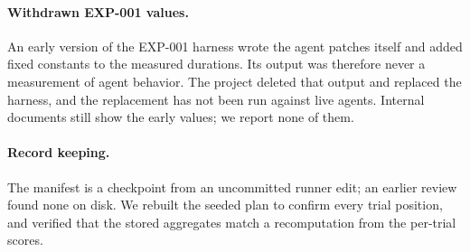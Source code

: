 \paragraph{Withdrawn EXP-001 values.} An early version of the EXP-001 harness wrote the agent patches itself and added fixed constants to the measured durations. Its output was therefore never a measurement of agent behavior. The project deleted that output and replaced the harness, and the replacement has not been run against live agents. Internal documents still show the early values; we report none of them.

\paragraph{Record keeping.} The manifest is a checkpoint from an uncommitted runner edit; an earlier review found none on disk. We rebuilt the seeded plan to confirm every trial position, and verified that the stored aggregates match a recomputation from the per-trial scores.
